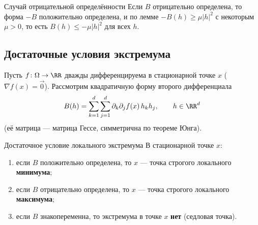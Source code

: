 \begin{Remark}{Случай отрицательной определённости}{}
	Если $B$ отрицательно определена, то форма $-B$ положительно определена, и по
	лемме $-B(h)\ge\mu|h|^2$ с некоторым $\mu>0$, то есть $B(h)\le -\mu|h|^2$ для всех
	$h$.
\end{Remark}

\subsection*{Достаточные условия экстремума}

Пусть $f\colon\Omega\to\RR$ дважды дифференцируема в стационарной точке $x$
($\nabla f(x)=\vec 0$). Рассмотрим квадратичную форму второго дифференциала
\[
B(h)=\sum_{k=1}^{d}\sum_{j=1}^{d}\partial_k\partial_j f(x)\,h_k h_j,\qquad h\in\RR^d
\]
(её матрица --- матрица Гессе, симметрична по теореме Юнга).

\begin{Theorem}{Достаточное условие локального экстремума}{}
	В стационарной точке $x$:
	\begin{enumerate}
		\item если $B$ положительно определена, то $x$ --- точка строгого локального
		\textbf{минимума};
		\item если $B$ отрицательно определена, то $x$ --- точка строгого локального
		\textbf{максимума};
		\item если $B$ знакопеременна, то экстремума в точке $x$ \textbf{нет} (седловая
		точка).
	\end{enumerate}
\end{Theorem}

